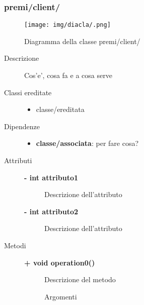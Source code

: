 \subsubsection{premi/client/}
\begin{figure}[H]
\begin{center}
\texttt{[image: img/diacla/.png]}
\caption{Diagramma della classe premi/client/}
\end{center}
\end{figure}


\begin{description}
\item[Descrizione] \hfill
	Cos'e', cosa fa e a cosa serve
	
	
\item[Classi ereditate] \hfill
	\begin{itemize}
		\item classe/ereditata
	\end{itemize}
	
	
\item[Dipendenze] \hfill
	\begin{itemize}
		\item \textbf{classe/associata}: per fare cosa?
	\end{itemize}
	
	
\item[Attributi] \hfill
	\begin{description}
		\item[\textbf{- int attributo1			}] \hfill
			Descrizione dell'attributo
		\item[\textbf{- int attributo2			}] \hfill
			Descrizione dell'attributo
	\end{description}
	
	
\item[Metodi] \hfill

	\begin{description}
		\item[\textbf{\color{blue}+ void operation0()			}] \hfill
			Descrizione del metodo
			
		\begin{description}
			\item[Argomenti] \hfill
				\begin{itemize}
				

\end{itemize}
\end{description}
\end{description}
\end{description}
